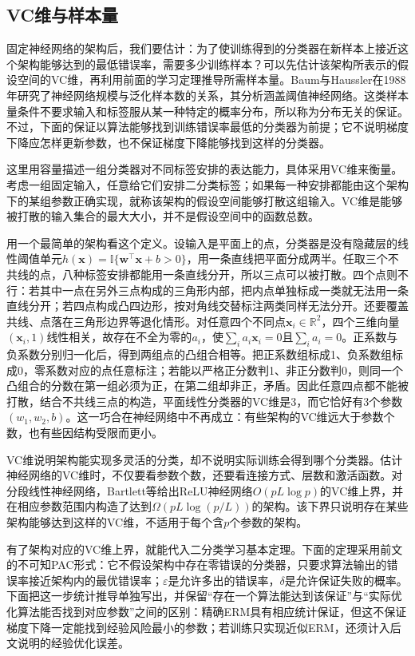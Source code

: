 \subsection{VC维与样本量}

固定神经网络的架构后，我们要估计：为了使训练得到的分类器在新样本上接近这个架构能够达到的最低错误率，需要多少训练样本？可以先估计该架构所表示的假设空间的VC维，再利用前面的学习定理推导所需样本量。Baum与Haussler在1988年研究了神经网络规模与泛化样本数的关系，其分析涵盖阈值神经网络。这类样本量条件不要求输入和标签服从某一种特定的概率分布，所以称为分布无关的保证。不过，下面的保证以算法能够找到训练错误率最低的分类器为前提；它不说明梯度下降应怎样更新参数，也不保证梯度下降能够找到这样的分类器。

这里用容量描述一组分类器对不同标签安排的表达能力，具体采用VC维来衡量。考虑一组固定输入，任意给它们安排二分类标签；如果每一种安排都能由这个架构下的某组参数正确实现，就称该架构的假设空间能够打散这组输入。VC维是能够被打散的输入集合的最大大小，并不是假设空间中的函数总数。

用一个最简单的架构看这个定义。设输入是平面上的点，分类器是没有隐藏层的线性阈值单元$h(\bm x)=\mathbb I\{\bm w^\top\bm x+b>0\}$，用一条直线把平面分成两半。任取三个不共线的点，八种标签安排都能用一条直线分开，所以三点可以被打散。四个点则不行：若其中一点在另外三点构成的三角形内部，把内点单独标成一类就无法用一条直线分开；若四点构成凸四边形，按对角线交替标注两类同样无法分开。还要覆盖共线、点落在三角形边界等退化情形。对任意四个不同点$\bm x_i\in\mathbb R^2$，四个三维向量$(\bm x_i,1)$线性相关，故存在不全为零的$a_i$，使$\sum_i a_i\bm x_i=0$且$\sum_i a_i=0$。正系数与负系数分别归一化后，得到两组点的凸组合相等。把正系数组标成1、负系数组标成0，零系数对应的点任意标注；若能以严格正分数判1、非正分数判0，则同一个凸组合的分数在第一组必须为正，在第二组却非正，矛盾。因此任意四点都不能被打散，结合不共线三点的构造，平面线性分类器的VC维是3，而它恰好有3个参数$(w_1,w_2,b)$。这一巧合在神经网络中不再成立：有些架构的VC维远大于参数个数，也有些因结构受限而更小。

VC维说明架构能实现多灵活的分类，却不说明实际训练会得到哪个分类器。估计神经网络的VC维时，不仅要看参数个数，还要看连接方式、层数和激活函数。对分段线性神经网络，Bartlett等给出ReLU神经网络$O(pL\log p)$的VC维上界，并在相应参数范围内构造了达到$\Omega(pL\log(p/L))$的架构。该下界只说明存在某些架构能够达到这样的VC维，不适用于每个含$p$个参数的架构。

有了架构对应的VC维上界，就能代入二分类学习基本定理。下面的定理采用前文的不可知PAC形式：它不假设架构中存在零错误的分类器，只要求算法输出的错误率接近架构内的最优错误率；$\varepsilon$是允许多出的错误率，$\delta$是允许保证失败的概率。下面把这一步统计推导单独写出，并保留“存在一个算法能达到该保证”与“实际优化算法能否找到对应参数”之间的区别：精确ERM具有相应统计保证，但这不保证梯度下降一定能找到经验风险最小的参数；若训练只实现近似ERM，还须计入后文说明的经验优化误差。


